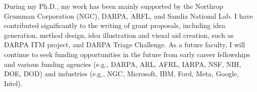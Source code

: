 During my Ph.D., my work has been mainly supported by the Northrop Grumman Corporation (NGC), 
DARPA, ARFL, and Sandia National Lab. 
I have contributed significantly to the writing of grant proposals, including idea
generation, method design, idea illustration and visual aid creation, such as 
DARPA ITM project, and DARPA Triage Challenge.
As a future faculty, I will continue to seek funding opportunities in the future from early career fellowships and various funding agencies (e.g., DARPA, ARL, AFRL, IARPA, NSF, NIH, DOE, DOD) and industries (e.g., NGC, Microsoft, IBM, Ford, Meta, Google, Intel).








